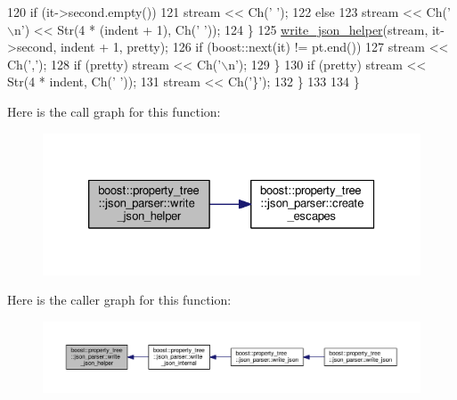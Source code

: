 \begin{DoxyCode}
120         \textcolor{keywordflow}{if} (it->second.empty())
121           stream << Ch(\textcolor{charliteral}{' '});
122         \textcolor{keywordflow}{else}
123           stream << Ch(\textcolor{charliteral}{'\(\backslash\)n'}) << Str(4 * (indent + 1), Ch(\textcolor{charliteral}{' '}));
124       \}
125       \hyperlink{namespaceboost_1_1property__tree_1_1json__parser_a133973ddea67e6d77424312cd297b332}{write\_json\_helper}(stream, it->second, indent + 1, pretty);
126       \textcolor{keywordflow}{if} (boost::next(it) != pt.end())
127         stream << Ch(\textcolor{charliteral}{','});
128       \textcolor{keywordflow}{if} (pretty) stream << Ch(\textcolor{charliteral}{'\(\backslash\)n'});
129     \}
130     \textcolor{keywordflow}{if} (pretty) stream << Str(4 * indent, Ch(\textcolor{charliteral}{' '}));
131     stream << Ch(\textcolor{charliteral}{'\}'});
132   \}
133 
134 \}
\end{DoxyCode}


Here is the call graph for this function\+:
\nopagebreak
\begin{figure}[H]
\begin{center}
\leavevmode
\includegraphics[width=326pt]{namespaceboost_1_1property__tree_1_1json__parser_a133973ddea67e6d77424312cd297b332_cgraph}
\end{center}
\end{figure}




Here is the caller graph for this function\+:
\nopagebreak
\begin{figure}[H]
\begin{center}
\leavevmode
\includegraphics[width=350pt]{namespaceboost_1_1property__tree_1_1json__parser_a133973ddea67e6d77424312cd297b332_icgraph}
\end{center}
\end{figure}


